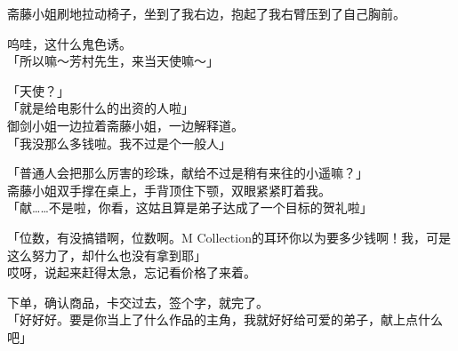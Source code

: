 斋藤小姐刷地拉动椅子，坐到了我右边，抱起了我右臂压到了自己胸前。

呜哇，这什么鬼色诱。\\

「所以嘛～芳村先生，来当天使嘛～」

「天使？」\\

「就是给电影什么的出资的人啦」\\

御剑小姐一边拉着斋藤小姐，一边解释道。\\

「我没那么多钱啦。我不过是个一般人」

「普通人会把那么厉害的珍珠，献给不过是稍有来往的小遥嘛？」\\

斋藤小姐双手撑在桌上，手背顶住下颚，双眼紧紧盯着我。\\

「献……不是啦，你看，这姑且算是弟子达成了一个目标的贺礼啦」

「位数，有没搞错啊，位数啊。M Collection的耳环你以为要多少钱啊！我，可是这么努力了，却什么也没有拿到耶」\\

哎呀，说起来赶得太急，忘记看价格了来着。

下单，确认商品，卡交过去，签个字，就完了。\\

「好好好。要是你当上了什么作品的主角，我就好好给可爱的弟子，献上点什么吧」

